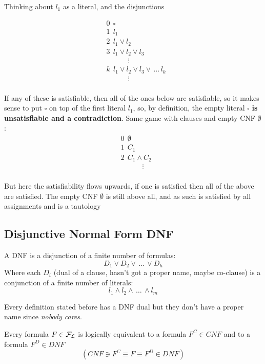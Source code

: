 	\noindent
	Thinking about $l_1$ as a literal, and the disjunctions

	\begin{align*}
	  	&0 \ \ \square \\
		&1 \ \ l_1 \\
		&2 \ \ l_1 \vee l_2 \\
		&3 \ \ l_1 \vee l_2 \vee l_3 \\
	  	&\quad \quad \quad \vdots \\
	  	&k \ \ l_1 \vee l_2 \vee l_3 \vee \, \dots \, l_k \\
	  	&\quad \quad \quad \vdots \\
	\end{align*}

	If any of these is satisfiable, then all of the ones below are satisfiable, so it makes sense to put $\square$ on top of the first literal $l_1$, so, by definition, the empty literal $\square$ \textbf{is unsatisfiable and a contradiction}.
	Same game with clauses and empty CNF $\emptyset$:
	\begin{align*}
	  	&0 \ \ \emptyset \\
		&1 \ \ C_1 \\
		&2 \ \ C_1 \wedge C_2 \\
	  	&\quad \quad \quad \vdots \\
	\end{align*}

	But here the satisfiability flows upwards, if one is satisfied then all of the above are satisfied. The empty CNF $\emptyset$ is still above all, and as such is satisfied by all assignments and is a tautology

	\subsection{Disjunctive Normal Form DNF}

	A DNF is a disjunction of a finite number of formulas:
	$$ D_1 \vee D_2 \vee \, \dots \, \vee D_h $$
	Where each $D_i$ (dual of a clause, hasn't got a proper name, maybe co-clause) is a conjunction of a finite number of literals:
	$$ l_1 \wedge l_2 \wedge \, \dots \, \wedge l_m $$

	\noindent
	Every definition stated before has a DNF dual but they don't have a proper name since \textit{nobody cares}.

	\begin{lemma} Every formula $F \in \mathcal{F}_\mathcal{L}$ is logically equivalent to a formula $F^C \in CNF$ and to a formula $F^D \in DNF$
	$$ (CNF \ni F^C \equiv F \equiv F^D \in DNF )$$
	\end{lemma}

